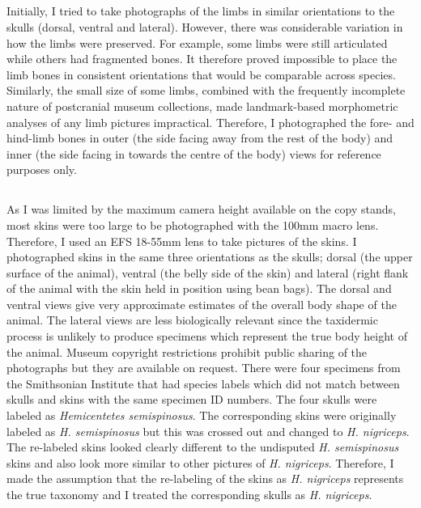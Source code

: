	\subsection{}
	Initially, I tried to take photographs of the limbs in similar orientations to the skulls (dorsal, ventral and lateral). However, there was considerable variation in how the limbs were preserved. For example, some limbs were still articulated while others had fragmented bones. It therefore proved impossible to place the limb bones in consistent orientations that would be comparable across species. Similarly, the small size of some limbs, combined with the frequently incomplete nature of postcranial museum collections, made landmark-based morphometric analyses of any limb pictures impractical. Therefore, I photographed the fore- and hind-limb bones in outer (the side facing away from the rest of the body) and inner (the side facing in towards the centre of the body) views for reference purposes only.	
	
	\subsection{}
	As I was limited by the maximum camera height available on the copy stands, most skins were too large to be photographed with the 100mm macro lens. Therefore, I used an EFS 18-55mm lens to take pictures of the skins. I photographed skins in the same three orientations as the skulls; dorsal (the upper surface of the animal), ventral (the belly side of the skin) and lateral (right flank of the animal with the skin held in position using bean bags). The dorsal and ventral views give very approximate estimates of the overall body shape of the animal. The lateral views are less biologically relevant since the taxidermic process is unlikely to produce specimens which represent the true body height of the animal. Museum copyright restrictions prohibit public sharing of the photographs but they are available on request.
	There were four specimens from the Smithsonian Institute that had species labels which did not match between skulls and skins with the same specimen ID numbers. The four skulls were labeled as \textit{Hemicentetes semispinosus}. The corresponding skins were originally labeled as \textit{H. semispinosus} but this was crossed out and changed to \textit{H. nigriceps}. The re-labeled skins looked clearly different to the undisputed \textit{H. semispinosus} skins and also look more similar to other pictures of \textit{H. nigriceps}. Therefore, I made the assumption that the re-labeling of the skins as \textit{H. nigriceps} represents the true taxonomy and I treated the corresponding skulls as \textit{H. nigriceps}.



	

	
